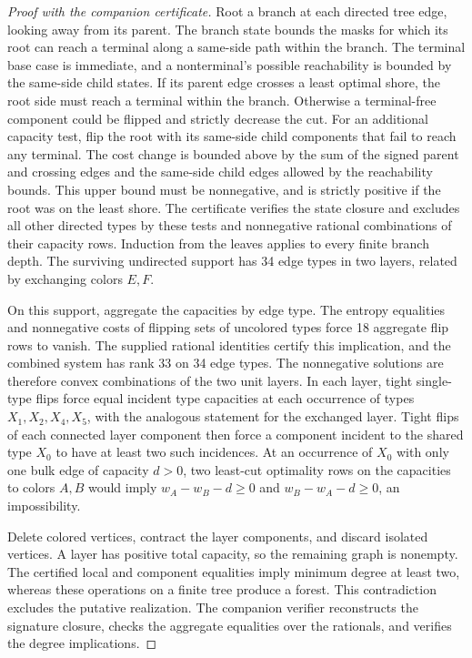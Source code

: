 \documentclass[11pt]{article}
\begin{document}
\begin{proof}[Proof with the companion certificate]
Root a branch at each directed tree edge, looking away from its
parent. The branch state bounds the masks for which its root can
reach a terminal along a same-side path within the branch. The
terminal base case is immediate, and a nonterminal's possible
reachability is bounded by the same-side child states. If its parent
edge crosses a least optimal shore, the root side must reach a
terminal within the branch. Otherwise a terminal-free component
could be flipped and strictly decrease the cut. For an additional
capacity test, flip the root with its same-side child components
that fail to reach any terminal. The cost change is bounded above by
the sum of the signed parent and crossing edges and the same-side
child edges allowed by the reachability bounds. This upper bound
must be nonnegative, and is strictly positive if the root was on
the least shore. The certificate verifies the state closure and
excludes all other directed types by these tests and nonnegative
rational combinations of their capacity rows. Induction from the
leaves applies to every finite branch depth. The surviving undirected
support has 34 edge types in two layers, related by exchanging
colors \(E,F\).

On this support, aggregate the capacities by edge type. The entropy
equalities and nonnegative costs of flipping sets of uncolored
types force 18 aggregate flip rows to vanish. The supplied rational
identities certify this implication, and the combined system has
rank 33 on 34 edge types. The nonnegative solutions are therefore
convex combinations of the two unit layers. In each layer, tight
single-type flips force equal incident type capacities at each
occurrence of types \(X_1,X_2,X_4,X_5\), with the analogous statement
for the exchanged layer. Tight flips of each connected layer
component then force a component incident to the shared type \(X_0\)
to have at least two such incidences. At an occurrence of \(X_0\)
with only one bulk edge of capacity \(d>0\), two least-cut
optimality rows on the capacities to colors \(A,B\) would imply
\(w_A-w_B-d\geq0\) and \(w_B-w_A-d\geq0\), an impossibility.

Delete colored vertices, contract the layer components, and discard
isolated vertices. A layer has positive total capacity, so the
remaining graph is nonempty. The certified local and component
equalities imply minimum degree at least two, whereas these
operations on a finite tree produce a forest. This contradiction
excludes the putative realization. The companion verifier
reconstructs the signature closure, checks the aggregate equalities
over the rationals, and verifies the degree implications.
\end{proof}
\end{document}
